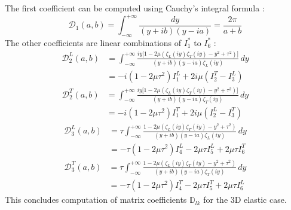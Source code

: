 The first coefficient can be computed using Cauchy's integral formula :
\begin{equation}
\mathcal{D}_1(a,b)=\int_{-\infty}^{+\infty} \frac{dy}{(y+ib)(y-ia)}=\frac{2\pi}{a+b}
\end{equation}
The other coefficients are linear combinations of $I_1^*$ to $I_6^*$ :
\begin{equation}
\begin{split}
\mathcal{D}_2^L(a,b)&=\int_{-\infty}^{+\infty} \frac{iy\lbrack 1-2\mu (\zeta_L(iy) \zeta_T(iy)- y^2+\tau^2)\rbrack}{(y+ib)(y-ia)\zeta_L(iy)} \,dy \\
&=-i(1-2\mu\tau^2)I_1^L+2i\mu(I_2^T-I_3^L)
\end{split}
\label{D2L}
\end{equation}
\begin{equation}
\begin{split}
\mathcal{D}_2^T(a,b)&=\int_{-\infty}^{+\infty} \frac{iy\lbrack 1-2\mu (\zeta_L(iy) \zeta_T(iy)- y^2+\tau^2)\rbrack}{(y+ib)(y-ia)\zeta_T(iy)} \,dy \\
&=-i(1-2\mu\tau^2)I_1^T+2i\mu(I_2^L-I_3^T)
\end{split}
\label{D2T}
\end{equation}
\begin{equation}
\begin{split}
\mathcal{D}_3^L(a,b)&=\tau\int_{-\infty}^{+\infty} \frac{1-2\mu(\zeta_L(iy)\zeta_T(iy)-y^2+\tau^2)}{(y+ib)(y-ia)\zeta_L(iy)}\,dy \\
&=-\tau(1-2\mu\tau^2)I_4^L-2\mu\tau I_5^L+2\mu\tau I_6^T
\end{split}
\label{D3L}
\end{equation}
\begin{equation}
\begin{split}
\mathcal{D}_3^T(a,b)&=\tau\int_{-\infty}^{+\infty} \frac{1-2\mu(\zeta_L(iy)\zeta_T(iy)-y^2+\tau^2)}{(y+ib)(y-ia)\zeta_T(iy)}\,dy \\
&=-\tau(1-2\mu\tau^2)I_4^T-2\mu\tau I_5^T+2\mu\tau I_6^L
\end{split}
\label{D3T}
\end{equation}
This concludes computation of matrix coefficients $\mathbb{D}_{lk}$ for the 3D elastic case.